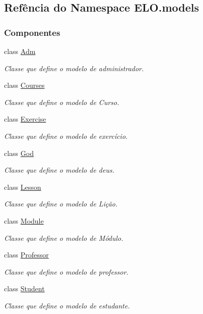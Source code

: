 \hypertarget{namespaceELO_1_1models}{}\subsection{Refência do Namespace E\+L\+O.\+models}
\label{namespaceELO_1_1models}
\subsubsection*{Componentes}
\begin{DoxyCompactItemize}
\item 
class \hyperlink{classELO_1_1models_1_1Adm}{Adm}
\begin{DoxyCompactList}\small\item\em Classe que define o modelo de administrador. \end{DoxyCompactList}\item 
class \hyperlink{classELO_1_1models_1_1Courses}{Courses}
\begin{DoxyCompactList}\small\item\em Classe que define o modelo de Curso. \end{DoxyCompactList}\item 
class \hyperlink{classELO_1_1models_1_1Exercise}{Exercise}
\begin{DoxyCompactList}\small\item\em Classe que define o modelo de exercício. \end{DoxyCompactList}\item 
class \hyperlink{classELO_1_1models_1_1God}{God}
\begin{DoxyCompactList}\small\item\em Classe que define o modelo de deus. \end{DoxyCompactList}\item 
class \hyperlink{classELO_1_1models_1_1Lesson}{Lesson}
\begin{DoxyCompactList}\small\item\em Classe que define o modelo de Lição. \end{DoxyCompactList}\item 
class \hyperlink{classELO_1_1models_1_1Module}{Module}
\begin{DoxyCompactList}\small\item\em Classe que define o modelo de Módulo. \end{DoxyCompactList}\item 
class \hyperlink{classELO_1_1models_1_1Professor}{Professor}
\begin{DoxyCompactList}\small\item\em Classe que define o modelo de professor. \end{DoxyCompactList}\item 
class \hyperlink{classELO_1_1models_1_1Student}{Student}
\begin{DoxyCompactList}\small\item\em Classe que define o modelo de estudante. \end{DoxyCompactList}\end{DoxyCompactItemize}

